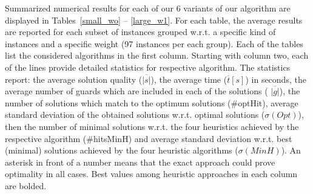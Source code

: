 \documentclass[runningheads,a4paper]{elsarticle}
\begin{document}
         Summarized numerical results for each of our 6 variants of our algorithm are displayed
         in Tables~\ref{small_wo} -- \ref{large_w1}. For each table, the average results are reported for each subset of instances grouped w.r.t. a specific kind of instances and a specific weight (97 instances per each group). Each of the tables list the considered algorithms in the first column. Starting with column two,  each of the lines provide detailed statistics for respective algorithm.  The statistics report: the average solution quality ($\overline{|s|}$), the average time ($\overline{t}[s]$) in seconds, the average number of guards which are included in each of the solutions ( $\overline{|g|}$), the number of solutions which match to the optimum solutions (\#optHit), average standard deviation of the obtained solutions w.r.t. optimal solutions ($\sigma(Opt)$), then the number of minimal solutions w.r.t. the four heuristics achieved by the respective algorithm (\#hitsMinH) and average standard deviation w.r.t. best (minimal) solutions achieved by the four heuristic algorithms   ($\sigma(MinH)$).  An asterisk in front of a number means that the exact approach  could prove optimality in all cases. Best values among heuristic approaches in each column are bolded.


     \begin{table}[]
     	\centering
        \caption{The results on the benchmark set $MinArea$ for the type of weight $W0$.}\label{small_wo}
     \end{table}
\end{document}
